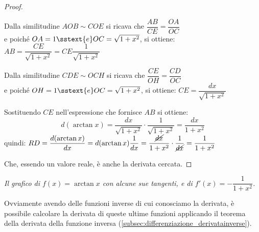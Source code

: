 \begin{proof}
~

Dalla similitudine 
\(AOB \sim COE\) si ricava che \quad \(\dfrac{AB}{CE} = \dfrac{OA}{OC}\) \\
e poiché\quad  
\(OA = 1 \sstext{e} OC = \sqrt{1 +x^2}\), \quad 
si ottiene: \quad 
\(AB = \dfrac{CE}{\sqrt{1 +x^2}} = CE \dfrac{1}{\sqrt{1 +x^2}}\) 


Dalla similitudine 
\(CDE \sim OCH\) si ricava che \quad \(\dfrac{CE}{OH} = \dfrac{CD}{OC}\) \\
e poiché \quad 
\(OH = 1 \sstext{e} OC = \sqrt{1 +x^2}\), \quad 
si ottiene: \quad 
\(CE = \dfrac{dx}{\sqrt{1 +x^2}}\) 

Sostituendo \(CE\) nell'espressione che fornisce \(AB\) 
si ottiene:
\[d(\arctan x) = \dfrac{dx}{\sqrt{1 +x^2}} \cdot \dfrac{1}{\sqrt{1 +x^2}} =
\dfrac{dx}{1 +x^2}\]
quindi: \hspace{10mm}
\(RD = \dfrac{d(\arctan x)}{dx} = d(\arctan x) \dfrac{1}{dx} = 
  \dfrac{\cancel{dx}}{1 +x^2} \cdot \dfrac{1}{\cancel{dx}} = 
  \dfrac{1}{1 +x^2}\)

\vspace{.5em}
Che, essendo un valore reale, è anche la derivata cercata.
\end{proof}

\begin{inaccessibleblock}
\begin{center} \scalebox{.8}{\arcotangente} \end{center}
\begin{center} \scalebox{.8}{\derivataarcotangente} \end{center}
\end{inaccessibleblock}
\label{img:diff_parabola_con_pendenze}
\begin{center} 
\emph{Il grafico di \(f(x)=\arctan x\) con alcune sue tangenti, e di 
\(f'(x)=-\dfrac{1}{1+x^2}\).}
\end{center}

\begin{osservazione}
Ovviamente avendo delle funzioni inverse di cui conosciamo la derivata, è 
possibile calcolare la derivata di queste ultime funzioni applicando il teorema 
della derivata della funzione inversa 
(\ref{subsec:differenziazione_derivatainverse}).
\end{osservazione}

